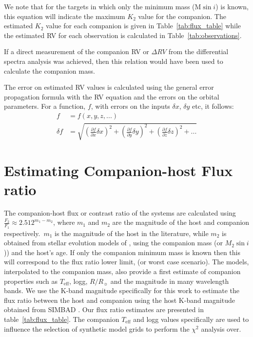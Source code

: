 We note that for the targets in which only the minimum mass (\(\textrm{M}\sin{i} \)) is known, this equation will indicate the maximum \(K_2\) value for the companion. The estimated \(K_2\) value for each companion is given in Table~\ref{tab:flux_table} while the estimated RV for each observation is calculated in Table~\ref{tab:observations}.

If a direct measurement of the companion RV or \(\Delta RV \) from the differential spectra analysis was achieved, then this relation would have been used to calculate the companion mass.

The error on estimated RV values is calculated using the general error propagation formula \citep{ku_notes_1966} with the RV equation and the errors on the orbital parameters. For a function, \(f\), with errors on the inputs \(\delta x\), \(\delta y\) etc, it follows: 
\begin{align}
	f &= f(x, y, z, ...)\\
	\delta f &= \sqrt{{\left( \frac{\partial f}{\partial x} \delta x\right)}^2 +  {\left(\frac{\partial f}{\partial y} \delta y\right)}^2 + {\left(\frac{\partial f}{\partial z} \delta z\right)}^2 + ...}
\end{align}  


\section{Estimating Companion-host Flux ratio}

\label{compaion flux ration}
The companion-host flux or contrast ratio of the systems are calculated using \( \frac{F_{2}}{F_{1}} \approx 2.512^{m_{1}-m_{2}} \), where \(m_{1} \) and \(m_{2} \) are the magnitude of the host and companion respectively.\ \(m_{1} \) is the magnitude of the host in the literature, while \(m_{2} \) is obtained from stellar evolution models of \citet{baraffe_evolutionary_2003, baraffe_new_2015}, using the companion mass (or \(M_{2}\sin{i}\))) and the host's age. If only the companion minimum mass is known then this will correspond to the flux ratio lower limit, (or worst case scenario). The models, interpolated to the companion mass, also provide a first estimate of companion properties such as \(T_{\textrm{eff}}\), logg, \(R/R_{\sun}\) and the magnitude in many wavelength bands.
We use the K-band magnitude specifically for this work to estimate the flux ratio between the host and companion using the host K-band magnitude obtained from SIMBAD \citep{wenger_simbad_2000}. Our flux ratio estimates are presented in table~\ref{tab:flux_table}.
The companion \(T_{\textrm{eff}}\) and logg values specifically are used to influence the selection of synthetic model grids to perform the \(\chi^2\) analysis over.

